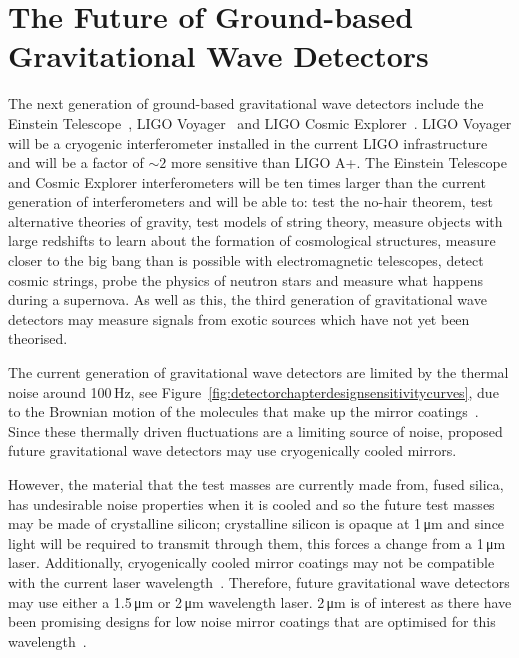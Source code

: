 \section{The Future of Ground-based Gravitational Wave Detectors}
\label{sec:detector_chapter_3G}
The next generation of ground-based gravitational wave detectors include the Einstein Telescope~\cite{Punturo2010,Hild2011}, LIGO Voyager~\cite{Adhikari2020} and LIGO Cosmic Explorer~\cite{Abbott2017e,Reitze2019,Hall2020}. LIGO Voyager will be a cryogenic interferometer installed in the current LIGO infrastructure and will be a factor of $\sim\!2$ more sensitive than LIGO A+. The Einstein Telescope and Cosmic Explorer interferometers will be ten times larger than the current generation of interferometers and will be able to: test the no-hair theorem, test alternative theories of gravity, test models of string theory, measure objects with large redshifts to learn about the formation of cosmological structures, measure closer to the big bang than is possible with electromagnetic telescopes, detect cosmic strings, probe the physics of neutron stars and measure what happens during a supernova. As well as this, the third generation of gravitational wave detectors may measure signals from exotic sources which have not yet been theorised.
\par
The current generation of gravitational wave detectors are limited by the thermal noise around 100\,Hz, see Figure~\ref{fig:detectorchapterdesignsensitivitycurves}, due to the Brownian motion of the molecules that make up the mirror coatings~\cite{InstrumentWhitePaper2019}. Since these thermally driven fluctuations are a limiting source of noise, proposed future gravitational wave detectors may use cryogenically cooled mirrors.
\par
However, the material that the test masses are currently made from, fused silica, has undesirable noise properties when it is cooled\cite{Schroeter2007} and so the future test masses may be made of crystalline silicon; crystalline silicon is opaque at 1\,\si{\micro\metre}\cite{Green1995} and since light will be required to transmit through them, this forces a change from a 1\,\si{\micro\metre} laser. Additionally, cryogenically cooled mirror coatings may not be compatible with the current laser wavelength~\cite{Martin2008,Martin2010,Martin2014}. Therefore, future gravitational wave detectors may use either a 1.5\,\si{\micro\metre} or 2\,\si{\micro\metre} wavelength laser\cite{Reitze2019,Hall2020}. 2\,\si{\micro\metre} is of interest as there have been promising designs for low noise mirror coatings that are optimised for this wavelength~\cite{Craig2019}.
